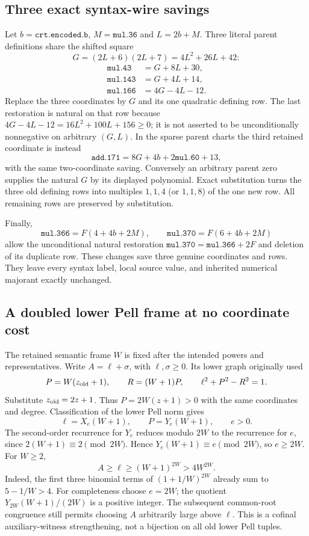 \subsection{Three exact syntax-wire savings}
Let $b=\texttt{crt.encoded.b}$, $M=\texttt{mul.36}$ and $L=2b+M$.
Three literal parent definitions share the shifted square
\[
 G=(2L+6)(2L+7)=4L^2+26L+42:
\]
\begin{align*}
 \texttt{mul.43}&=G+8L+30,\\
 \texttt{mul.143}&=G+4L+14,\\
 \texttt{mul.166}&=4G-4L-12.
\end{align*}
Replace the three coordinates by $G$ and its one quadratic defining row.
The last restoration is natural on that row because
$4G-4L-12=16L^2+100L+156\ge0$; it is not asserted to be
unconditionally nonnegative on arbitrary $(G,L)$. In the sparse parent
charts the third retained coordinate is instead
\[
 \texttt{add.171}=8G+4b+2\texttt{mul.60}+13,
\]
with the same two-coordinate saving. Conversely an arbitrary parent zero
supplies the natural $G$ by its displayed polynomial. Exact substitution
turns the three old defining rows into multiples $1,1,4$ (or $1,1,8$)
of the one new row. All remaining rows are preserved by substitution.

Finally,
\[
 \texttt{mul.366}=F(4+4b+2M),\qquad
 \texttt{mul.370}=F(6+4b+2M)
\]
allow the unconditional natural restoration
$\texttt{mul.370}=\texttt{mul.366}+2F$ and deletion of its duplicate row.
These changes save three genuine coordinates and rows. They leave every
syntax label, local source value, and inherited numerical majorant exactly
unchanged.

\subsection{A doubled lower Pell frame at no coordinate cost}
The retained semantic frame $W$ is fixed after the intended powers and
representatives. Write $A=\ell+\sigma$, with $\ell,\sigma\ge0$. Its lower
graph originally used
\[
 P=W(z_{\rm old}+1),\qquad R=(W+1)P,\qquad
 \ell^2+P^2-R^2=1.
\]
Substitute $z_{\rm old}=2z+1$. Thus $P=2W(z+1)>0$ with the same
coordinates and degree. Classification of the lower Pell norm gives
\[
 \ell=X_e(W+1),\qquad P=Y_e(W+1),\qquad e>0.
\]
The second-order recurrence for $Y_e$ reduces modulo $2W$ to the recurrence
for $e$, since $2(W+1)\equiv2\pmod{2W}$. Hence
$Y_e(W+1)\equiv e\pmod{2W}$, so $e\ge2W$. For $W\ge2$,
\[
 A\ge\ell\ge(W+1)^{2W}>4W^{2W}.                 \tag{N1}
\]
Indeed, the first three binomial terms of $(1+1/W)^{2W}$ already sum to
$5-1/W>4$. For completeness choose $e=2W$; the quotient
$Y_{2W}(W+1)/(2W)$ is a positive integer. The subsequent common-root
congruence still permits choosing $A$ arbitrarily large above $\ell$.
This is a cofinal auxiliary-witness strengthening, not a bijection on all
old lower Pell tuples.

